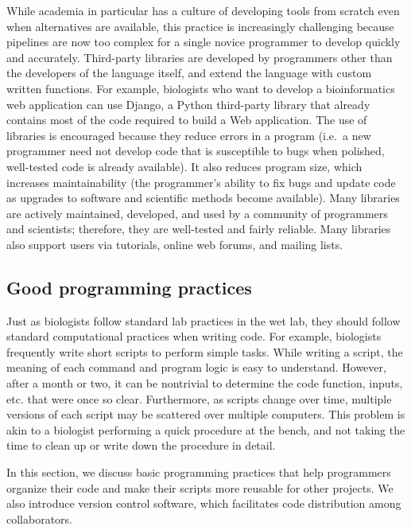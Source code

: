 \documentclass[ChapterTOCs,krantz2]{krantz} %
\begin{document}
While academia in particular has a culture of 
developing tools from scratch even when alternatives are available, this practice
is increasingly challenging because pipelines are now too complex for a single novice programmer 
to develop quickly and accurately\cite{Wilson2006}. Third-party libraries are developed 
by programmers other than the developers of the language itself, and extend the language
with custom written functions.  For example,   
biologists who want to develop a bioinformatics web application 
can use Django, a Python third-party library that already contains most of the
code required to build a Web application.  The use of libraries is encouraged because they
reduce errors in a program (i.e.\ a new programmer need not 
develop code that is susceptible to bugs when
polished, well-tested code is already available). It also reduces program size, 
which increases maintainability (the programmer's ability to fix 
bugs and update code as upgrades to software and scientific methods
become available).
Many libraries are actively maintained, developed, and used
by a community of programmers and scientists; therefore, they are well-tested
and fairly reliable. Many libraries also support users via tutorials, online
web forums, and mailing lists.


\subsection{Good programming practices}

Just as biologists follow standard lab practices in the wet lab, they
should follow standard computational practices when writing code.
For example, biologists frequently write short scripts to perform
simple tasks. While writing a script, the 
meaning of each command and program logic 
is easy to understand.  However, after a month or two, it can be
nontrivial to determine the code function, inputs, etc. that were once
so clear.
Furthermore, as scripts change over time, multiple versions of each script may be scattered 
over multiple computers. This problem is akin to a biologist performing a
quick procedure at the bench, and not taking the time to clean up or write down the procedure in detail.

In this section, we discuss basic programming
practices that help programmers organize their code and make their
scripts more reusable for other projects. We also introduce 
version control software, which facilitates
code distribution among collaborators.
\end{document}
